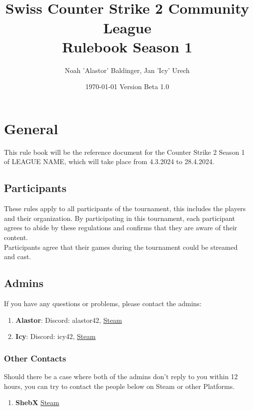 \documentclass{article}
\title{\name\\ Swiss Counter Strike 2 Community League\\Rulebook Season 1}
\author{Noah 'Alastor' Baldinger, Jan 'Icy' Urech}
\date{\today \hspace{1cm} Version Beta 1.0}
\def\name{LEAGUE NAME}
\begin{document}
\maketitle
\tableofcontents

\pagebreak
\section{General}
This rule book will be the reference document for the Counter Strike 2 Season 1 of \name, which will take place from 4.3.2024 to 28.4.2024. 

\subsection{Participants}
These rules apply to all participants of the tournament, this includes the players and their organization. By participating in this tournament, each participant agrees to abide by these regulations and confirms that they are aware of their content.\\
Participants agree that their games during the tournament could be streamed and cast.


\subsection{Admins}\label{admins}
If you have any questions or problems, please contact the admins:
\begin{enumerate}
    \item \textbf{Alastor}: Discord: alastor42, \href{https://steamcommunity.com/id/-rotsala-/}{Steam}
    \item \textbf{Icy}: Discord: icy42, \href{https://steamcommunity.com/id/icyq}{Steam}
\end{enumerate}
\subsubsection{Other Contacts}
Should there be a case where both of the admins don't reply to you within 12 hours, you can try to contact the people below on 
Steam or other Platforms.
\begin{enumerate}
    \item \textbf{ShebX} \href{https://steamcommunity.com/id/ShebX}{Steam}

\end{enumerate}
\end{document}
